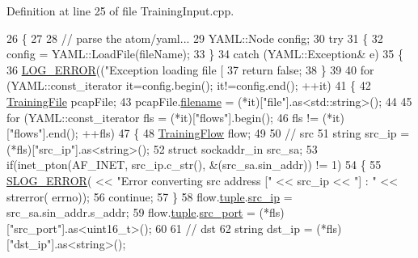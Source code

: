 Definition at line 25 of file Training\-Input.\-cpp.


\begin{DoxyCode}
26 \{
27 
28     \textcolor{comment}{// parse the atom/yaml...}
29     YAML::Node config;
30     \textcolor{keywordflow}{try} 
31     \{
32         config = YAML::LoadFile(fileName);
33     \} 
34     \textcolor{keywordflow}{catch} (YAML::Exception& e)
35     \{
36         \hyperlink{_logger_8h_aa2ffef3c03ca18789b5d04ac9b260128}{LOG\_ERROR}((\textcolor{stringliteral}{"Exception loading file [%
37         \textcolor{keywordflow}{return} \textcolor{keyword}{false};
38     \}
39 
40     \textcolor{keywordflow}{for} (YAML::const\_iterator it=config.begin(); it!=config.end(); ++it) 
41     \{
42         \hyperlink{class_vsid_training_1_1_training_file}{TrainingFile} pcapFile;
43         pcapFile.\hyperlink{class_vsid_training_1_1_training_file_a91ebe9f6b1a3af67d8f4540587eadbf3}{filename} = (*it)[\textcolor{stringliteral}{"file"}].as<std::string>();
44 
45         \textcolor{keywordflow}{for} (YAML::const\_iterator fls = (*it)[\textcolor{stringliteral}{"flows"}].begin(); 
46                 fls != (*it)[\textcolor{stringliteral}{"flows"}].end(); ++fls)
47         \{
48             \hyperlink{class_vsid_training_1_1_training_flow}{TrainingFlow} flow;
49 
50             \textcolor{comment}{// src}
51             \textcolor{keywordtype}{string} src\_ip = (*fls)[\textcolor{stringliteral}{"src\_ip"}].as<\textcolor{keywordtype}{string}>();
52             \textcolor{keyword}{struct }sockaddr\_in src\_sa;
53             \textcolor{keywordflow}{if}(inet\_pton(AF\_INET, src\_ip.c\_str(), &(src\_sa.sin\_addr)) != 1)
54             \{
55                 \hyperlink{_logger_8h_a2a8694cd392d18f4db6b9cc9f15bafe3}{SLOG\_ERROR}( << \textcolor{stringliteral}{"Error converting src address ["} << src\_ip << \textcolor{stringliteral}{"] : "} << strerror(
      errno));
56                 \textcolor{keywordflow}{continue};
57             \} 
58             flow.\hyperlink{class_vsid_training_1_1_training_flow_a687b85a2f6d23cb0ea63f61637df5bcf}{tuple}.\hyperlink{class_vsid_common_1_1_i_pv4_tuple_a2db76e768086b4ac0aabfed850940c76}{src\_ip} = src\_sa.sin\_addr.s\_addr;
59             flow.\hyperlink{class_vsid_training_1_1_training_flow_a687b85a2f6d23cb0ea63f61637df5bcf}{tuple}.\hyperlink{class_vsid_common_1_1_i_pv4_tuple_a68b8ec74e1abb0d15ba66c48837a1662}{src\_port} = (*fls)[\textcolor{stringliteral}{"src\_port"}].as<uint16\_t>();
60 
61             \textcolor{comment}{// dst}
62             \textcolor{keywordtype}{string} dst\_ip = (*fls)[\textcolor{stringliteral}{"dst\_ip"}].as<\textcolor{keywordtype}{string}>();
}
\end{DoxyCode}
